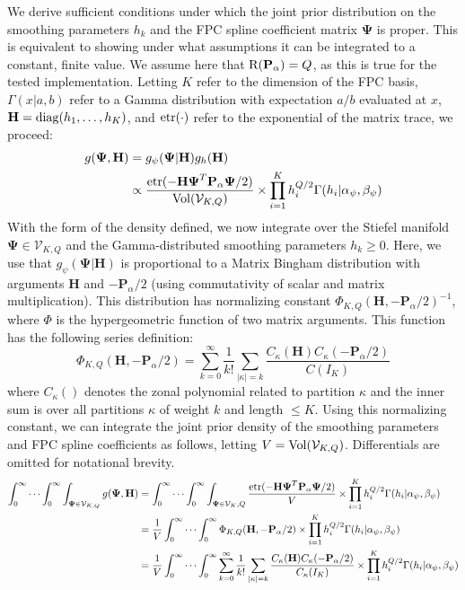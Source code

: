 \documentclass[12pt]{article}
\begin{document}
We derive sufficient conditions under which the joint prior distribution on the smoothing parameters $h_k$ and the FPC spline coefficient matrix $\boldsymbol{\Psi}$ is proper. This is equivalent to showing under what assumptions it can be integrated to a constant, finite value. We assume here that ${\rm R}(\mathbf{P}_\alpha) = Q$, as this is true for the tested implementation. Letting $K$ refer to the dimension of the FPC basis, $\Gamma(x| a, b)$ refer to a Gamma distribution with expectation $a/b$ evaluated at $x$, $\mathbf{H} = {\rm diag}(h_1, \ldots, h_K)$, and ${\rm etr}(\cdot)$ refer to the exponential of the matrix trace, we proceed:
\begin{align*}
    g(\boldsymbol{\Psi}, \mathbf{H}) & = g_\psi(\boldsymbol{\Psi}|\mathbf{H})g_h(\mathbf{H})\\
    & \propto \frac{{\rm etr}(-\mathbf{H}\boldsymbol{\Psi}^T \mathbf{P}_\alpha \boldsymbol{\Psi}/2)}{{\rm Vol}(\mathcal{V}_{K,Q})} \times \prod_{i = 1}^K h_i^{Q/2} \Gamma(h_i|\alpha_\psi, \beta_\psi)
\end{align*}
With the form of the density defined, we now integrate over the Stiefel manifold $\boldsymbol{\Psi} \in \mathcal{V}_{K, Q}$ and the Gamma-distributed smoothing parameters $h_k \geq 0$. Here, we use that $g_\psi(\boldsymbol{\Psi}|\mathbf{H})$ is proportional to a Matrix Bingham distribution with arguments $\mathbf{H}$ and $-\mathbf{P}_\alpha/2$ (using commutativity of scalar and matrix multiplication). This distribution has normalizing constant $\Phi_{K, Q}(\mathbf{H}, -\mathbf{P}_\alpha/2)^{-1}$, where $\Phi$ is the hypergeometric function of two matrix arguments. This function has the following series definition:
$$\Phi_{K, Q}(\mathbf{H}, -\mathbf{P}_\alpha/2) = \sum_{k = 0}^\infty \frac{1}{k!} \sum_{|\kappa| = k} \frac{C_\kappa(\mathbf{H})C_\kappa(-\mathbf{P}_\alpha/2)}{C(I_K)}$$
\noindent where $C_\kappa()$ denotes the zonal polynomial related to partition $\kappa$ and the inner sum is over all partitions $\kappa$ of weight $k$ and length $\leq K$. Using this normalizing constant, we can integrate the joint prior density of the smoothing parameters and FPC spline coefficients as follows, letting $V = {\rm Vol}(\mathcal{V}_{K,Q})$. Differentials are omitted for notational brevity.
\begin{align*}
     \int_0^{\infty} \cdots \int_0^\infty \int_{\boldsymbol{\Psi} \in \mathcal{V}_{K,Q}} g(\boldsymbol{\Psi}, \mathbf{H}) & = \int_0^\infty \cdots \int_0^\infty \int_{\boldsymbol{\Psi} \in \mathcal{V}_K,Q} \frac{{\rm etr}(-\mathbf{H}\boldsymbol{\Psi}^T \mathbf{P}_\alpha \boldsymbol{\Psi}/2)}{V}  \times \prod_{i = 1}^K h_i^{Q/2} \Gamma(h_i| \alpha_\psi, \beta_\psi)\\
     & = \frac{1}{V}\int_0^\infty \cdots \int_0^\infty \Phi_{K,Q}(\mathbf{H}, -\mathbf{P}_\alpha/2) \times \prod_{i = 1}^K h_i^{Q/2} \Gamma(h_i| \alpha_\psi, \beta_\psi)\\
     & = \frac{1}{V}\int_0^\infty \cdots \int_0^\infty \sum_{k = 0}^\infty \frac{1}{k!} \sum_{|\kappa| = k} \frac{C_\kappa(\mathbf{H})C_\kappa(-\mathbf{P}_\alpha/2)}{C_\kappa(I_K)} \times \prod_{i = 1}^K h_i^{Q/2} \Gamma(h_i| \alpha_\psi, \beta_\psi)
\end{align*}
\end{document}
